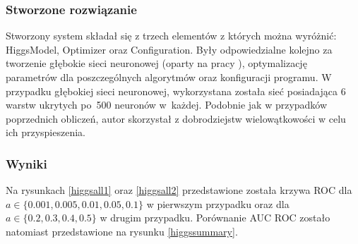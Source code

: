 \subsubsection{Stworzone rozwiązanie}
Stworzony system składał się z trzech elementów z których można wyróżnić: HiggsModel, Optimizer oraz Configuration. Były odpowiedzialne kolejno za tworzenie głębokie sieci neuronowej (oparty na pracy \cite{higgs2}), optymalizację parametrów dla poszczególnych algorytmów oraz konfiguracji programu. W przypadku głębokiej sieci neuronowej, wykorzystana została sieć posiadająca 6 warstw ukrytych po~500 neuronów w~każdej. Podobnie jak w przypadków poprzednich obliczeń, autor skorzystał z dobrodziejstw wielowątkowości w celu ich przyspieszenia.


\subsubsection{Wyniki}
Na rysunkach \ref{higgsall1} oraz \ref{higgsall2} przedstawione została krzywa ROC dla $a\in\{0.001, 0.005, 0.01, 0.05, 0.1\}$ w pierwszym przypadku oraz dla $a\in\{0.2, 0.3, 0.4, 0.5\}$ w drugim przypadku. Porównanie AUC ROC zostało natomiast przedstawione na rysunku \ref{higgssummary}.

